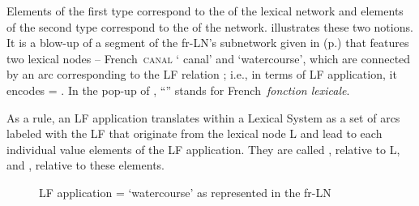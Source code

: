 Elements of the first type correspond to the  of the lexical network and elements of the second type correspond to the  of the network.  illustrates these two notions. It is a blow-up of a segment of the fr-LN's subnetwork given in  (p.\thinspace\pageref{fig:taxonomicNonTaxonomicLNs}) that features two lexical nodes -- {\smaller French}~\textsc{canal}  {\small ` canal'} and  {\small `watercourse'}, which are connected by an arc corresponding to the LF relation ; i.e., in terms of LF application, it encodes  = . In the pop-up of , ``'' stands for {\smaller French}~\textit{fonction lexicale}.

As a rule, an LF application  translates within a Lexical System as a set of arcs labeled with the LF  that originate from the lexical node L and lead to each individual value elements of the LF application. They are called , relative to L, and , relative to these elements.

\begin{figure}

\caption[ =  {\footnotesize `watercourse'} as represented in the fr-LN]{LF application  =  {\footnotesize `watercourse'} as represented in the fr-LN}\label{fig:canal-coursDEau}
\end{figure}


